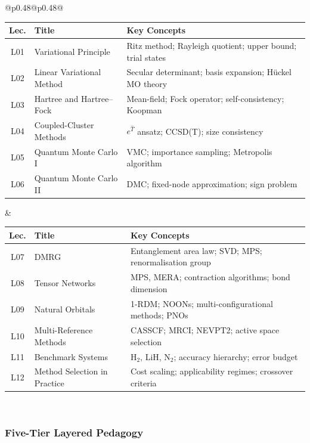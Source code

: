 \documentclass[11pt,a4paper]{article}
\begin{document}
\begin{center}
\begin{tabular}{@{}p{}@{\textwidth}p{}@{}}
\begin{tabular}[t]{@{}clp{4.5cm}@{}}
\toprule
\textbf{Lec.} & \textbf{Title} & \textbf{Key Concepts}\\
\midrule
L01 & Variational Principle & Ritz method; Rayleigh quotient; upper bound; trial states\\
L02 & Linear Variational Method & Secular determinant; basis expansion; H\"uckel MO theory\\
L03 & Hartree and Hartree--Fock & Mean-field; Fock operator; self-consistency; Koopman\\
L04 & Coupled-Cluster Methods & $e^{\hat{T}}$ ansatz; CCSD(T); size consistency\\
L05 & Quantum Monte Carlo I & VMC; importance sampling; Metropolis algorithm\\
L06 & Quantum Monte Carlo II & DMC; fixed-node approximation; sign problem\\
\bottomrule
\end{tabular}
&
\begin{tabular}[t]{@{}clp{4.5cm}@{}}
\toprule
\textbf{Lec.} & \textbf{Title} & \textbf{Key Concepts}\\
\midrule
L07 & DMRG & Entanglement area law; SVD; MPS; renormalisation group\\
L08 & Tensor Networks & MPS, MERA; contraction algorithms; bond dimension\\
L09 & Natural Orbitals & 1-RDM; NOONs; multi-configurational methods; PNOs\\
L10 & Multi-Reference Methods & CASSCF; MRCI; NEVPT2; active space selection\\
L11 & Benchmark Systems & H$_2$, LiH, N$_2$; accuracy hierarchy; error budget\\
L12 & Method Selection in Practice & Cost scaling; applicability regimes; crossover criteria\\
\bottomrule
\end{tabular}
\\
\end{tabular}
\end{center}

\subsubsection*{Five-Tier Layered Pedagogy}
\end{document}

